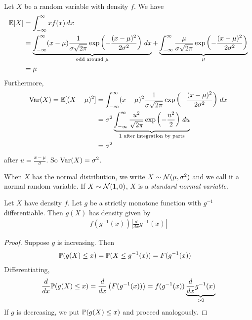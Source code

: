 \documentclass{../../template/note}
\begin{document}
    Let \(X\) be a random variable with density \(f\). We have
    \begin{align*}
        \mathbb E[X] &= \int_{-\infty}^\infty xf(x) \,d{x} \\
        &= \underbrace{\int_{-\infty}^\infty (x-\mu)\frac{1}{\sigma \sqrt{2\pi}} \exp\left(-\frac{(x-\mu)^2}{2\sigma^2}\right) \,d{x}}_{\text{odd around } \mu} + \underbrace{\int_{-\infty}^\infty \frac{\mu}{\sigma \sqrt{2\pi}} \exp\left(-\frac{(x-\mu)^2}{2\sigma^2}\right)}_{\mu} \\
        &= \mu
    \end{align*}
    Furthermore, 
    \begin{align*}
        \operatorname{Var}(X) = \mathbb E[(X-\mu)^2] &= \int_{-\infty}^\infty (x-\mu)^2 \frac 1{\sigma\sqrt{2\pi}} \exp\left(-\frac{(x-\mu)^2}{2\sigma^2}\right) \,d{x} \\
        &= \sigma^2 \underbrace{\int_{-\infty}^\infty \frac{u^2}{\sqrt{2\pi}} \exp\left(-\frac{u^2}2\right) \,d{u}}_{\text{1 after integration by parts}} \\
        &= \sigma^2
    \end{align*}
    after \(u = \frac{x-\mu}{\sigma}\). So \(\operatorname{Var}(X) = \sigma^2\).

    When \(X\) has the normal distribution, we write \(X \sim \mathcal{N}(\mu, \sigma^2)\) and we call it a normal random variable. If \(X \sim \mathcal{N}(1, 0)\), \(X\) is a \emph{standard normal variable}.

    \begin{proposition}
        Let \(X\) have density \(f\). Let \(g\) be a strictly monotone function with \(g^{-1}\) differentiable. Then \(g(X)\) has density given by
        \begin{align*}
            f(g^{-1}(x)) \left|\frac{d}{dx}g^{-1}(x)\right|
        \end{align*}
    \end{proposition}
    
    \begin{proof}
        Suppose \(g\) is increasing. Then
        \begin{align*}
            \mathbb P(g(X) \leq x) &= \mathbb P(X \leq g^{-1}(x)) = F(g^{-1}(x))
        \end{align*}
        Differentiating,
        \begin{align*}
            \frac{d}{dx} \mathbb P(g(X) \leq x) = \frac{d}{dx}\left(F(g^{-1}(x))\right) = f(g^{-1}(x)) \underbrace{\frac{d}{dx} g^{-1}(x)}_{>0}
        \end{align*}
        If \(g\) is decreasing, we put \(\mathbb P(g(X) \leq x)\) and proceed analogously.       
    \end{proof}
    
\end{document}
